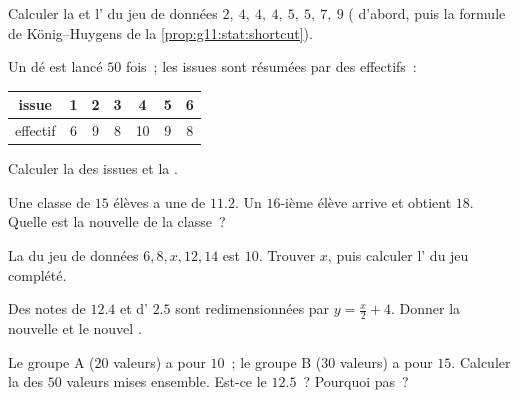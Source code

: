 \begin{exercise}[$\star$]\label{exo:g11:stat:2}
Calculer la  et l' du jeu de données
$2,\ 4,\ 4,\ 4,\ 5,\ 5,\ 7,\ 9$ ( d'abord, puis la formule de
König--Huygens de la \cref{prop:g11:stat:shortcut}).
\end{exercise}

\begin{exercise}[$\star$]\label{exo:g11:stat:3}
Un dé est lancé $50$ fois~; les issues sont résumées par des
effectifs~:
\begin{center}
\begin{tabular}{c|cccccc}
issue & 1 & 2 & 3 & 4 & 5 & 6\\
\hline
effectif & 6 & 9 & 8 & 10 & 9 & 8
\end{tabular}
\end{center}
Calculer la  des issues et la .
\end{exercise}

\begin{exercise}[$\star\star$]\label{exo:g11:stat:4}
Une classe de $15$ élèves a une  de $11.2$. Un $16$-ième élève
arrive et obtient $18$. Quelle est la nouvelle  de la classe~?
\end{exercise}

\begin{exercise}[$\star\star$]\label{exo:g11:stat:5}
La  du jeu de données $6, 8, x, 12, 14$ est $10$. Trouver $x$,
puis calculer l' du jeu complété.
\end{exercise}

\begin{exercise}[$\star$]\label{exo:g11:stat:6}
Des notes de  $12.4$ et d' $2.5$ sont redimensionnées
par $y = \frac{x}{2} + 4$. Donner la nouvelle  et le nouvel
.
\end{exercise}

\begin{exercise}[$\star\star$]\label{exo:g11:stat:7}
Le groupe A ($20$ valeurs) a pour  $10$~; le groupe B ($30$
valeurs) a pour  $15$. Calculer la  des $50$ valeurs mises
ensemble. Est-ce le  $12.5$~? Pourquoi pas~?
\end{exercise}

